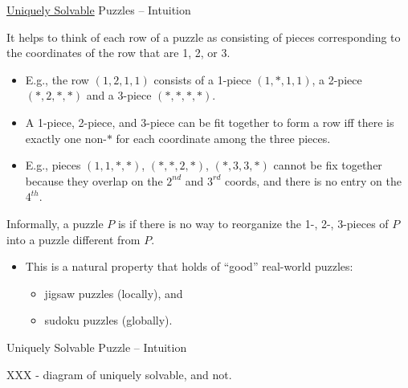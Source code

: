 \documentclass[t,10pt,
mathserif,xcolor=dvipsnames]{beamer}
\begin{document}
\begin{myframe}{\uline{Uniquely Solvable} Puzzles -- Intuition}
  
  It helps to think of each row of a puzzle as consisting of
   pieces corresponding to the coordinates of the row
  that are 1, 2, or 3.


  \begin{itemize}
  \item E.g., the row $(1, 2, 1, 1)$ consists of a 1-piece $(1, *, 1,
    1)$, a 2-piece $(*, 2, *, *)$ and a 3-piece $(*, *, *, *)$.
    
  \item A 1-piece, 2-piece, and 3-piece can be fit together to form a
    row iff there is exactly one non-$*$ for each coordinate among the
    three pieces.
  
  \item E.g., pieces $(1, 1, *, *)$, $(*, *, 2, *)$, $(*, 3, 3, *)$
    cannot be fix together because they overlap on the $2^{nd}$ and
    $3^{rd}$ coords, and there is no entry on the $4^{th}$.

  \end{itemize}

  Informally, a puzzle $P$ is \emph{} if
  there is no way to reorganize the 1-, 2-, 3-pieces of $P$ into a
  puzzle different from $P$.

  \begin{itemize}
  \item This is a natural property that holds of ``good'' real-world puzzles:
    \begin{itemize}
    \item jigsaw puzzles (locally), and
    \item sudoku puzzles (globally).
    \end{itemize}
  \end{itemize}
  
\end{myframe}


\begin{myframe}{Uniquely Solvable Puzzle -- Intuition}

  XXX - diagram of uniquely solvable, and not.
  
\end{myframe}
\end{document}
